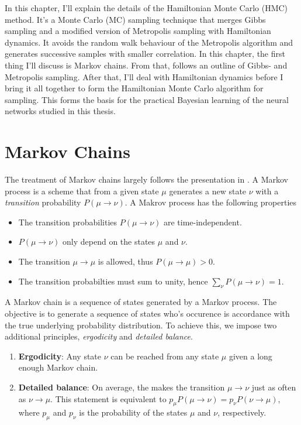 In this chapter, I'll explain the details of the Hamiltonian Monte Carlo (HMC) method.
It's a Monte Carlo (MC) sampling technique that merges Gibbs sampling and a modified version of Metropolis sampling
with Hamiltonian dynamics. It avoids the random walk behaviour of the Metropolis algorithm
and generates successive samples with smaller correlation. In this chapter, the first thing I'll discuss is Markov chains.
From that, follows an outline of Gibbs- and Metropolis sampling. After that, I'll deal with Hamiltonian dynamics before I bring it all together
to form the Hamiltonian Monte Carlo algorithm for sampling. This forms the basis for the practical Bayesian learning of the neural networks studied in this thesis.

\section{Markov Chains}
The treatment of Markov chains largely follows the presentation in \cite{markov_chains}. A Markov process is a scheme that from a given state $\mu$ generates a new state $\nu$ with a \textit{transition} probability $P(\mu \to \nu)$. A Makrov process has the following properties
\begin{itemize}
  \item The transition probabilities $P(\mu \to \nu)$ are time-independent.
  \item $P(\mu \to \nu)$ only depend on the states $\mu$ and $\nu$.
  \item The transition $\mu \to \mu$ is allowed, thus $P(\mu \to \mu) > 0$.
  \item The transition probabilties must sum to unity, hence $\sum_\nu P(\mu \to \nu) = 1$.
\end{itemize}
A Markov chain is a sequence of states generated by a Markov process.
The objective is to generate a sequence of states who's occurence is accordance with the true underlying probability distribution. To achieve this, we impose two additional principles, \textit{ergodicity} and \textit{detailed balance}. 
\begin{enumerate}
  \item \textbf{Ergodicity}: Any state $\nu$ can be reached from any state $\mu$ given a long enough Markov chain.
  \item \textbf{Detailed balance}: On average, the makes the transition $\mu \to \nu$ just as often as $\nu \to \mu$. This statement is equivalent to $p_\mu P(\mu \to \nu) = p_\nu P(\nu \to \mu)$, where $p_\mu$ and $p_\nu$ is the probability of the states $\mu$ and $\nu$, respectively.
\end{enumerate}

